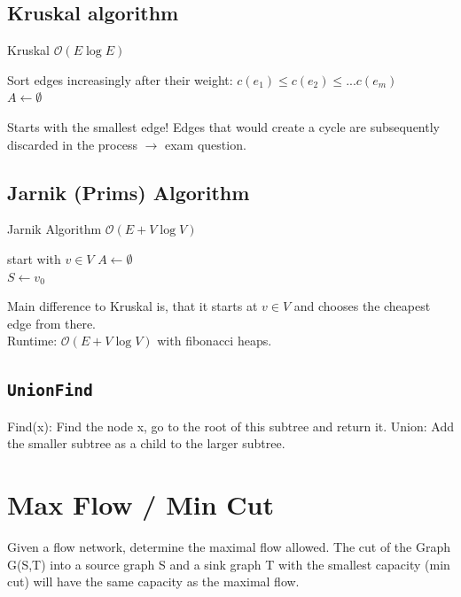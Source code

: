 \documentclass[9pt,landscape,a4paper, table]{extarticle}
\begin{document}
\begin{multicols*}{3}
\subsection{Kruskal algorithm}

{\scriptsize
\begin{algorithm}[H]
    \caption{Kruskal $\mathcal{O}(E \log E)$}
    
    \SetAlgoLined
    Sort edges increasingly after their weight:
    $c(e_1) \leq c(e_2) \leq... c(e_m)$\\
    $A \leftarrow \emptyset$
\end{algorithm}}
Starts with the smallest edge! Edges that would create a cycle are subsequently discarded in the process $\rightarrow$ exam question.\\

\subsection{Jarnik (Prims) Algorithm}
{\scriptsize
\begin{algorithm}[H]
    \caption{Jarnik Algorithm $\mathcal{O}(E + V \log V)$}
    
    \SetAlgoLined
    start with $v \in V$
    $A \leftarrow \emptyset$\\
    $S \leftarrow {v_0}$
\end{algorithm}}
Main difference to Kruskal is, that it starts at $v \in V$ and chooses the cheapest edge from there.\\
Runtime: $\mathcal{O}(E + V \log V)$ with fibonacci heaps.
\subsection{\texttt{UnionFind}}
Find(x): Find the node x, go to the root of this subtree and return it.
Union: Add the smaller subtree as a child to the larger subtree.

\section{Max Flow / Min Cut}
Given a flow network, determine the maximal flow allowed.
The cut of the Graph G(S,T) into a source graph S and a sink graph T with the smallest capacity (min cut) will have the same capacity as the maximal flow.


\end{multicols*}
\end{document}
